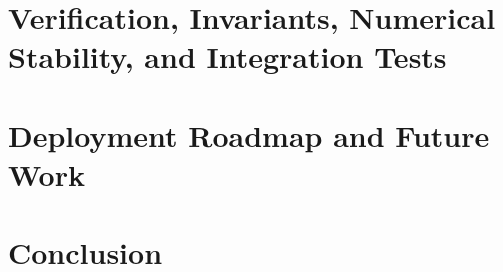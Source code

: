 \documentclass[lettersize,journal, twocolumn]{IEEEtran}
\begin{document}
\section{Verification, Invariants, Numerical Stability, and Integration Tests}
\label{Sec:Section_VIII_Verification_Invariants_Numerical_Stability_and_Integration_Tests}


\section{Deployment Roadmap and Future Work}
\label{Sec:Known_Gaps_and_Next_Steps_Toward_Deployment}


\section{Conclusion}
\label{Sec:Conclusion}




\end{document}
